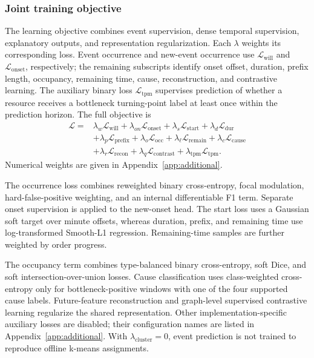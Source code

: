 \documentclass[a4paper,fleqn]{cas-dc}
\begin{document}
\subsubsection{Joint training objective}\label{sec:joint-optimization}

The learning objective combines event supervision, dense temporal supervision, explanatory outputs, and representation regularization. Each $\lambda$ weights its corresponding loss. Event occurrence and new-event occurrence use $\mathcal{L}_{\mathrm{will}}$ and $\mathcal{L}_{\mathrm{onset}}$, respectively; the remaining subscripts identify onset offset, duration, prefix length, occupancy, remaining time, cause, reconstruction, and contrastive learning. The auxiliary binary loss $\mathcal{L}_{\mathrm{tpm}}$ supervises prediction of whether a resource receives a bottleneck turning-point label at least once within the prediction horizon. The full objective is
\begin{equation}
\begin{aligned}
\mathcal{L}={}&
\lambda_w\mathcal{L}_{\mathrm{will}}+
\lambda_{on}\mathcal{L}_{\mathrm{onset}}+
\lambda_s\mathcal{L}_{\mathrm{start}}+
\lambda_d\mathcal{L}_{\mathrm{dur}}\\
&+\lambda_p\mathcal{L}_{\mathrm{prefix}}+
\lambda_o\mathcal{L}_{\mathrm{occ}}+
\lambda_{\ell}\mathcal{L}_{\mathrm{remain}}+
\lambda_c\mathcal{L}_{\mathrm{cause}}\\
&+\lambda_r\mathcal{L}_{\mathrm{recon}}+
\lambda_q\mathcal{L}_{\mathrm{contrast}}+
\lambda_{\mathrm{tpm}}\mathcal{L}_{\mathrm{tpm}} .
\end{aligned}
\end{equation}
Numerical weights are given in Appendix~\ref{app:additional}.

The occurrence loss combines reweighted binary cross-entropy, focal modulation, hard-false-positive weighting, and an internal differentiable F1 term. Separate onset supervision is applied to the new-onset head. The start loss uses a Gaussian soft target over minute offsets, whereas duration, prefix, and remaining time use log-transformed Smooth-L1 regression. Remaining-time samples are further weighted by order progress.

The occupancy term combines type-balanced binary cross-entropy, soft Dice, and soft intersection-over-union losses. Cause classification uses class-weighted cross-entropy only for bottleneck-positive windows with one of the four supported cause labels. Future-feature reconstruction and graph-level supervised contrastive learning regularize the shared representation. Other implementation-specific auxiliary losses are disabled; their configuration names are listed in Appendix~\ref{app:additional}. With $\lambda_{\mathrm{cluster}}=0$, event prediction is not trained to reproduce offline k-means assignments.
\end{document}
